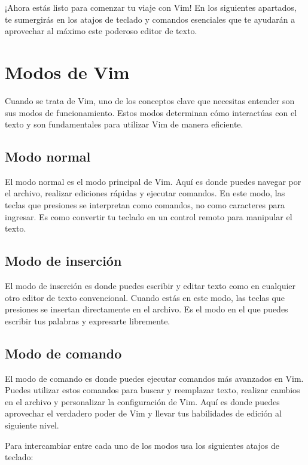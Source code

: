 \documentclass[
  doc,
  floatsintext,
  longtable,
  a4paper,
  nolmodern,
  notxfonts,
  notimes,
  12pt,
  colorlinks=true,linkcolor=blue,citecolor=blue,urlcolor=blue]{apa7}
\begin{document}
¡Ahora estás listo para comenzar tu viaje con Vim! En los siguientes
apartados, te sumergirás en los atajos de teclado y comandos esenciales
que te ayudarán a aprovechar al máximo este poderoso editor de texto.

\section{Modos de Vim}\label{modos-de-vim}

Cuando se trata de Vim, uno de los conceptos clave que necesitas
entender son sus modos de funcionamiento. Estos modos determinan cómo
interactúas con el texto y son fundamentales para utilizar Vim de manera
eficiente.

\subsection{Modo normal}\label{modo-normal}

El modo normal es el modo principal de Vim. Aquí es donde puedes navegar
por el archivo, realizar ediciones rápidas y ejecutar comandos. En este
modo, las teclas que presiones se interpretan como comandos, no como
caracteres para ingresar. Es como convertir tu teclado en un control
remoto para manipular el texto.

\subsection{Modo de inserción}\label{modo-de-inserciuxf3n}

El modo de inserción es donde puedes escribir y editar texto como en
cualquier otro editor de texto convencional. Cuando estás en este modo,
las teclas que presiones se insertan directamente en el archivo. Es el
modo en el que puedes escribir tus palabras y expresarte libremente.

\subsection{Modo de comando}\label{modo-de-comando}

El modo de comando es donde puedes ejecutar comandos más avanzados en
Vim. Puedes utilizar estos comandos para buscar y reemplazar texto,
realizar cambios en el archivo y personalizar la configuración de Vim.
Aquí es donde puedes aprovechar el verdadero poder de Vim y llevar tus
habilidades de edición al siguiente nivel.

Para intercambiar entre cada uno de los modos usa los siguientes atajos
de teclado:
\end{document}
